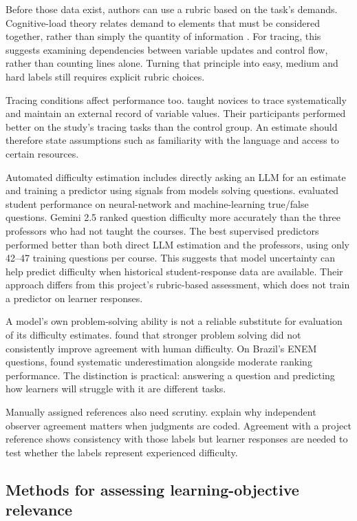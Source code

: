 Before those data exist, authors can use a rubric based on the task's demands. Cognitive-load theory relates demand to elements that must be considered together, rather than simply the quantity of information \parencite{sweller2010}. For tracing, this suggests examining dependencies between variable updates and control flow, rather than counting lines alone. Turning that principle into easy, medium and hard labels still requires explicit rubric choices.

Tracing conditions affect performance too. \textcite{xie2018} taught novices to trace systematically and maintain an external record of variable values. Their participants performed better on the study's tracing tasks than the control group. An estimate should therefore state assumptions such as familiarity with the language and access to certain resources.

Automated difficulty estimation includes directly asking an LLM for an estimate and training a predictor using signals from models solving questions. \textcite{zotos2025} evaluated student performance on neural-network and machine-learning true/false questions. Gemini 2.5 ranked question difficulty more accurately than the three professors who had not taught the courses. The best supervised predictors performed better than both direct LLM estimation and the professors, using only 42–47 training questions per course. This suggests that model uncertainty can help predict difficulty when historical student-response data are available. Their approach differs from this project’s rubric-based assessment, which does not train a predictor on learner responses.

A model's own problem-solving ability is not a reliable substitute for evaluation of its difficulty estimates. \textcite{li2026} found that stronger problem solving did not consistently improve agreement with human difficulty. On Brazil's ENEM questions, \textcite{brant2026} found systematic underestimation alongside moderate ranking performance. The distinction is practical: answering a question and predicting how learners will struggle with it are different tasks.

Manually assigned references also need scrutiny. \textcite{hayes2007} explain why independent observer agreement matters when judgments are coded. Agreement with a project reference shows consistency with those labels but learner responses are needed to test whether the labels represent experienced difficulty.

\subsection{Methods for assessing learning-objective relevance}\label{sec:literature-2-5}

